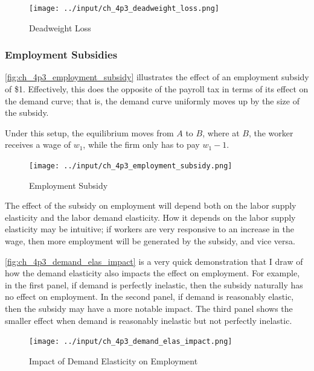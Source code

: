 \FloatBarrier

\begin{figure}[!htb]
    \centering
        \texttt{[image: ../input/ch\_4p3\_deadweight\_loss.png]}
    \caption{Deadweight Loss}
    \label{fig:ch_4p3_deadweight_loss}
\end{figure}

\FloatBarrier


\subsubsection{Employment Subsidies}

\autoref{fig:ch_4p3_employment_subsidy}
illustrates the effect of an employment subsidy of \$1.
Effectively, this does the opposite of 
the payroll tax in terms of its effect on the 
demand curve; that is, the demand curve uniformly moves up 
by the size of the subsidy.

Under this setup, the equilibrium moves from $A$ to $B$, where 
at $B$, the worker receives a wage of $w_1$, while the firm 
only has to pay $w_1 -1$.


\FloatBarrier

\begin{figure}[!htb]
    \centering
        \texttt{[image: ../input/ch\_4p3\_employment\_subsidy.png]}
    \caption{Employment Subsidy}
    \label{fig:ch_4p3_employment_subsidy}
\end{figure}

\FloatBarrier

The effect of the subsidy on employment will 
depend both on the labor supply elasticity 
and the labor demand elasticity.
How it depends on the labor supply elasticity may 
be intuitive; if workers are 
very responsive to an increase in the wage, then 
more employment will be generated by the subsidy, and 
vice versa.

\autoref{fig:ch_4p3_demand_elas_impact} is a very quick 
demonstration that I draw of how the 
demand elasticity also impacts the effect on employment.
For example, in the first panel, if demand is perfectly inelastic, then 
the subsidy naturally has no effect on employment.
In the second panel, if demand is 
reasonably elastic, then the subsidy may have a more 
notable impact. The third panel shows the 
smaller effect when demand is reasonably inelastic 
but not perfectly inelastic.

\FloatBarrier
\begin{figure}[!htb]
    \centering
        \texttt{[image: ../input/ch\_4p3\_demand\_elas\_impact.png]}
    \caption{Impact of Demand Elasticity on Employment}
    \label{fig:ch_4p3_demand_elas_impact}
\end{figure}
\FloatBarrier


